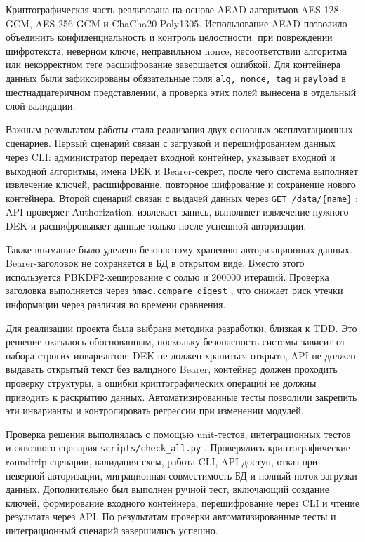 \documentclass[14pt, a4paper]{extarticle}
\renewcommand{\texttt}[1]{%
  {\def\UrlFont{\ttfamily}\nolinkurl{#1}}%
}
\begin{document}
	Криптографическая часть реализована на основе AEAD-алгоритмов AES-128-GCM, AES-256-GCM и ChaCha20-Poly1305. Использование AEAD позволило объединить конфиденциальность и контроль целостности: при повреждении шифротекста, неверном ключе, неправильном nonce, несоответствии алгоритма или некорректном теге расшифрование завершается ошибкой. Для контейнера данных были зафиксированы обязательные поля \texttt{alg, nonce, tag} и \texttt{payload} в шестнадцатеричном представлении, а проверка этих полей вынесена в отдельный слой валидации.
	
	Важным результатом работы стала реализация двух основных эксплуатационных сценариев. Первый сценарий связан с загрузкой и перешифрованием данных через CLI: администратор передает входной контейнер, указывает входной и выходной алгоритмы, имена DEK и Bearer-секрет, после чего система выполняет извлечение ключей, расшифрование, повторное шифрование и сохранение нового контейнера. Второй сценарий связан с выдачей данных через \texttt{GET /data/{name}}: API проверяет Authorization, извлекает запись, выполняет извлечение нужного DEK и расшифровывает данные только после успешной авторизации.
	
	Также внимание было уделено безопасному хранению авторизационных данных. Bearer-заголовок не сохраняется в БД в открытом виде. Вместо этого используется PBKDF2-хеширование с солью и 200000 итераций. Проверка заголовка выполняется через \texttt{hmac.compare\_digest}, что снижает риск утечки информации через различия во времени сравнения.
	
	Для реализации проекта была выбрана методика разработки, близкая к TDD. Это решение оказалось обоснованным, поскольку безопасность системы зависит от набора строгих инвариантов: DEK не должен храниться открыто, API не должен выдавать открытый текст без валидного Bearer, контейнер должен проходить проверку структуры, а ошибки криптографических операций не должны приводить к раскрытию данных. Автоматизированные тесты позволили закрепить эти инварианты и контролировать регрессии при изменении модулей.
	
	Проверка решения выполнялась с помощью unit-тестов, интеграционных тестов и сквозного сценария \texttt{scripts/check\_all.py}. Проверялись криптографические roundtrip-сценарии, валидация схем, работа CLI, API-доступ, отказ при неверной авторизации, миграционная совместимость БД и полный поток загрузки данных. Дополнительно был выполнен ручной тест, включающий создание ключей, формирование входного контейнера, перешифрование через CLI и чтение результата через API. По результатам проверки автоматизированные тесты и интеграционный сценарий завершились успешно.
\end{document}

